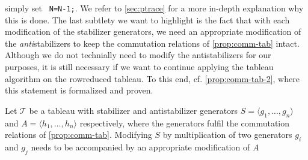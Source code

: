 simply set \verb| N=N-1;|. We refer to \cref{sec:ptrace} for a more in-depth
explanation why this is done. The last subtlety we want to highlight is the
fact that with each modification of the stabilizer generators, we need an
appropriate modification of the \emph{anti}stabilizers to keep the commutation
relations of \cref{prop:comm-tab} intact. Although we do not technially need to
modify the antistabilizers for our purposes, it is still necessary if we want
to continue applying the tableau algorithm on the rowreduced tableau. To this
end, cf. \cref{prop:comm-tab-2}, where this statement is formalized and proven.
\begin{prop}\label{prop:comm-tab-2}
  Let $\mathcal{T}$ be a tableau with stabilizer and antistabilizer generators
  $S=\langle g_1, \ldots, g_n \rangle$ and $A=\langle h_1, \ldots, h_n \rangle$
  respectively, where the generators fulfil the commutation relations of
  \cref{prop:comm-tab}. Modifying $S$ by multiplication of two generators $g_i$
  and $g_j$ needs to be accompanied by an appropriate modification of $A$
\end{prop}
